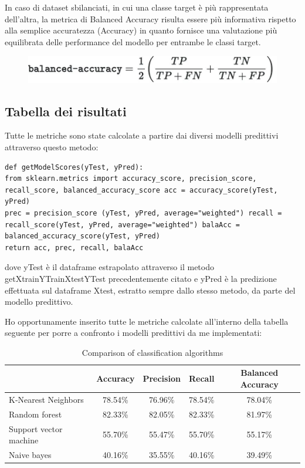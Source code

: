 In caso di dataset sbilanciati, in cui una classe target è più rappresentata dell'altra, la metrica di Balanced Accuracy risulta essere più informativa rispetto alla semplice accuratezza (Accuracy) in quanto fornisce una valutazione più equilibrata delle performance del modello per entrambe le classi target.

\begin{figure}
    \begin{center}    
        \includegraphics[width=0.9\linewidth]{images/image50.jpeg}
    \end{center}
\end{figure}

\subsection{Tabella dei risultati}
Tutte le metriche sono state calcolate a partire dai diversi modelli predittivi attraverso questo metodo:

\begin{verbatim} 
def getModelScores(yTest, yPred):
from sklearn.metrics import accuracy_score, precision_score, recall_score, balanced_accuracy_score acc = accuracy_score(yTest, yPred)
prec = precision_score (yTest, yPred, average="weighted") recall = recall_score(yTest, yPred, average="weighted") balaAcc = balanced_accuracy_score(yTest, yPred)
return acc, prec, recall, balaAcc
\end{verbatim}
dove yTest è il dataframe estrapolato attraverso il metodo getXtrainYTrainXtestYTest precedentemente citato e yPred è la predizione effettuata sul dataframe Xtest, estratto sempre dallo stesso metodo, da parte del modello predittivo.

Ho opportunamente inserito tutte le metriche calcolate all’interno della tabella seguente per porre a confronto i modelli predittivi da me implementati:

\begin{table}[h]
\centering
\begin{tabular}{|l|c|c|c|c|}
\hline
& Accuracy & Precision & Recall & Balanced Accuracy \\
\hline
K-Nearest Neighbors & 78.54\% & 76.96\% & 78.54\% & 78.04\% \\
\hline
Random forest & 82.33\% & 82.05\% & 82.33\% & 81.97\% \\
\hline
Support vector machine & 55.70\% & 55.47\% & 55.70\% & 55.17\% \\
\hline
Naive bayes & 40.16\% & 35.55\% & 40.16\% & 39.49\% \\
\hline
\end{tabular}
\caption{Comparison of classification algorithms}
\label{tab:classification}
\end{table}

